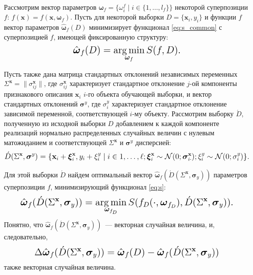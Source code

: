 \documentclass[11pt,a4paper]{article}
\theoremstyle{definition}
\begin{document}
Рассмотрим вектор параметров
$\boldsymbol{\omega}_f = \{ \omega_i^f \mid i \in \{ 1, \dots, l_f \} \}$
некоторой суперпозиции $f$: $f(\mathbf{x}) = f(\mathbf{x}, \boldsymbol{\omega}_f)$.
Пусть для некоторой выборки $D = \{ \mathbf{x}_i, y_i \}$ и функции
$f$ вектор параметров $\hat{\boldsymbol{\omega}}_f(D)$ минимизирует
функционал \eqref{eq:s_common} с суперпозицией $f$, имеющей фиксированную
структуру:
\[
  \Large
  \hat{\boldsymbol{\omega}}_f(D) = \mathop{\arg \min}\limits_{\boldsymbol{\omega}_f} S(f, D).
\]

Пусть также дана матрица стандартных отклонений
независимых переменных $\Sigma^{\mathbf{x}} = \| \sigma^{\mathbf{x}}_{ij} \|$,
где $\sigma^{\mathbf{x}}_{ij}$ характеризует стандартное отклонение $j$-ой
компоненты признакового описания $\mathbf{x}_i$ $i$-го объекта обучающей выборки,
и вектор стандартных отклонений $\boldsymbol{\sigma}^y$, где $\sigma^y_i$
характеризует стандартное отклонение зависимой переменной, соответствующей
$i$-му объекту.
Рассмотрим выборку $\acute{D}$, полученную из исходной выборки $D$
добавлением к каждой компоненте реализаций нормально распределенных
случайных величин с нулевым матожиданием и соответствующей
$\Sigma^{\mathbf{x}}$ и $\boldsymbol{\sigma}^y$ дисперсией:
\begin{equation}
  \Large
  \acute{D}(\Sigma^{\mathbf{x}}, \boldsymbol{\sigma}^y) = \{ \mathbf{x}_i + \boldsymbol{\xi}^{\mathbf{x}}_i, y_i + \xi^y_i \mid i \in 1, \dots, \ell; \boldsymbol{\xi}^{\mathbf{x}}_i \sim \mathcal{N}(0; \boldsymbol{\sigma}^{\mathbf{x}}_{i \cdot}); \xi^y_i \sim \mathcal{N}(0; \sigma^y_i) \}.
  \label{eq:d_acute}
\end{equation}

Для этой выборки $\acute{D}$ найдем оптимальный вектор $\hat{\boldsymbol{\omega}}_f (\acute{D} (\Sigma^{\mathbf{x}}, \boldsymbol{\sigma}_y))$
параметров суперпозиции $f$, минимизирующий функционал \eqref{eq:s}:
\begin{equation}
  \Large
  \hat{\boldsymbol{\omega}}_f (\acute{D} (\Sigma^{\mathbf{x}}, \boldsymbol{\sigma}_y)) = \mathop{\arg \min}\limits_{\boldsymbol{\omega}_{f_D}} S (f_D (\cdot, \boldsymbol{\omega}_{f_D}), \acute{D} (\Sigma^{\mathbf{x}}, \boldsymbol{\sigma}_y)).
  \label{eq:hat_omega}
\end{equation}
Понятно, что $\hat{\boldsymbol{\omega}}_f (\acute{D} (\Sigma^{\mathbf{x}}, \boldsymbol{\sigma}_y))$~---
векторная случайная величина, и, следовательно,
\[
  \Large
  \Delta\hat{\boldsymbol{\omega}}_f(\acute{D} (\Sigma^{\mathbf{x}}, \boldsymbol{\sigma}_y) ) = \hat{\boldsymbol{\omega}}_f(D) - \hat{\boldsymbol{\omega}}_f (\acute{D} (\Sigma^{\mathbf{x}}, \boldsymbol{\sigma}_y))
\]
также векторная случайная величина.
\end{document}
